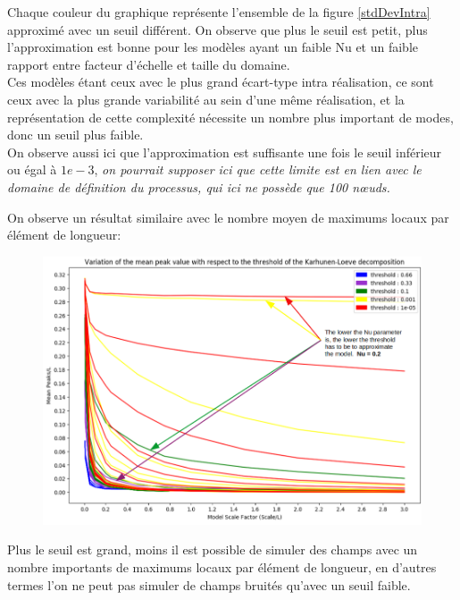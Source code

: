 \documentclass[a4paper,10pt]{article}
\begin{document}
	 Chaque couleur du graphique représente l'ensemble de la figure \ref{stdDevIntra} approximé avec un seuil différent. On observe que plus le seuil est petit, plus l'approximation est bonne pour les modèles ayant un faible Nu et un faible rapport entre facteur d'échelle et taille du domaine. \\
	 Ces modèles étant ceux avec le plus grand écart-type intra réalisation, ce sont ceux avec la plus grande variabilité au sein d'une même réalisation, et la représentation de cette complexité nécessite un nombre plus important de modes, donc un seuil plus faible. \\ 
	 On observe aussi ici que l'approximation est suffisante une fois le seuil inférieur ou égal à $1e-3$, \emph{on pourrait supposer ici que cette limite est en lien avec le domaine de définition du processus, qui ici ne possède que 100 nœuds.} 

\newpage
	 
	 On observe un résultat similaire avec le nombre moyen de maximums locaux par élément de longueur: 

\begin{figure}[H]
   \centering   
   \noindent \includegraphics[width = \linewidth]{MeanPeakValKL.png}
      \caption{}
         \label{MeanPeakValKL}
\end{figure}
	 
	Plus le seuil est grand, moins il est possible de simuler des champs avec un nombre importants de maximums locaux par élément de longueur, en d'autres termes l'on ne peut pas simuler de champs bruités qu'avec un seuil faible.
\end{document}
